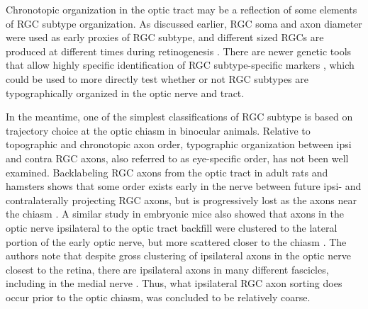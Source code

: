 Chronotopic organization in the optic tract may be a reflection of some elements of RGC subtype organization.
As discussed earlier, RGC soma and axon diameter were used as early proxies of RGC subtype, and different sized RGCs are produced at different times during retinogenesis \cite{rapaport1995spatiotemporal,reese1994birthdates}.
There are newer genetic tools that allow highly specific identification of RGC subtype-specific markers \cite[e.g.][]{blackshaw2004genomic,dhande2014retinal,baden2016functional,rivlin2011transgenic}, which could be used to more directly test whether or not RGC subtypes are typographically organized in the optic nerve and tract.

In the meantime, one of the simplest classifications of RGC subtype is based on trajectory choice at the optic chiasm in binocular animals.
Relative to topographic and chronotopic axon order, typographic organization between ipsi and contra RGC axons, also referred to as eye-specific order, has not been well examined.
Backlabeling RGC axons from the optic tract in adult rats and hamsters shows that some order exists early in the nerve between future ipsi- and contralaterally projecting RGC axons, but is progressively lost as the axons near the chiasm \cite{baker1989distribution}.
A similar study in embryonic mice also showed that axons in the optic nerve ipsilateral to the optic tract backfill were clustered to the lateral portion of the early optic nerve, but more scattered closer to the chiasm \cite{colello1990early}.
The authors note that despite gross clustering of ipsilateral axons in the optic nerve closest to the retina, there are ipsilateral axons in many different fascicles, including in the medial nerve \cite{colello1990early}.
Thus, what ipsilateral RGC axon sorting does occur prior to the optic chiasm, was concluded to be relatively coarse.

